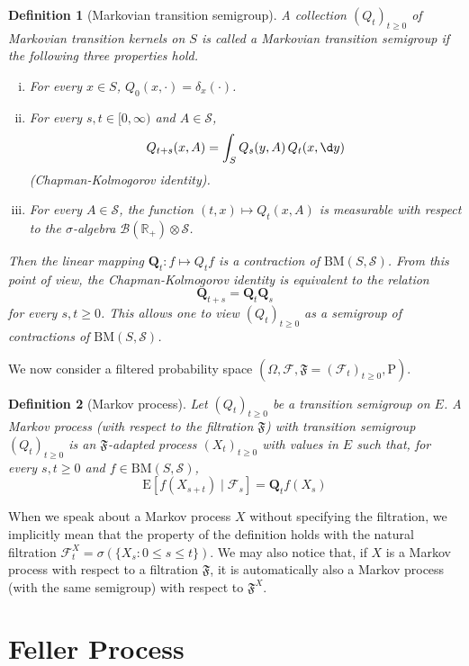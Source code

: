 \documentclass{report}
\newtheorem{definition}{Definition}[section]
\theoremstyle{nonumberplain}
\begin{document}
\begin{definition}[Markovian transition
	semigroup]
	A collection $\left(Q_t\right)_{t \geq 0}$ of Markovian transition kernels on $S$ is called a \emph{Markovian transition semigroup} if the following three properties hold.
	\begin{enumerate}[(i)]
	\item For every $x \in S$, $Q_0(x, \cdot)=\delta_x(\cdot)$.
	\item For every $s, t \in [0, \infty)$ and $A \in \mathcal{S}$,
	$$
	Q_{t+s}(x, A)=\int_S Q_s(y, A)\,Q_t(x,\d y) 
	$$
	(Chapman-Kolmogorov identity).
	\item For every $A \in \mathcal{S}$, the function $(t, x) \mapsto Q_t(x, A)$ is measurable with respect to the $\sigma$-algebra  $\mathcal{B}\left(\mathbb{R}_{+}\right) \otimes \mathcal{S}$.
\end{enumerate}
	Then the linear mapping $\mathbf{Q}_t: f \mapsto Q_t f$ is a contraction of $\mathrm{BM}(S,\mathcal{S})$. From this point of view, the Chapman-Kolmogorov identity is equivalent to the relation
	$$
	\mathbf{Q}_{t+s}=\mathbf{Q}_t\mathbf{Q}_s
	$$
	for every $s, t \geq 0$. This allows one to view $\left(Q_t\right)_{t \geq 0}$ as a semigroup of contractions of $\mathrm{BM}(S,\mathcal{S})$.
\end{definition}	
We now consider a filtered probability space $\left(\Omega, \mathcal{F},\mathfrak{F}=\left(\mathcal{F}_t\right)_{t \ge 0}, \mathrm{P}\right)$.
\begin{definition}[Markov process]
Let $\left(Q_t\right)_{t \geq 0}$ be a transition semigroup on $E$. A Markov process (with respect to the filtration $\mathfrak{F}$) with transition semigroup $\left(Q_t\right)_{t \geq 0}$ is an $\mathfrak{F}$-adapted process $\left(X_t\right)_{t \geq 0}$ with values in $E$ such that, for every $s, t \geq 0$ and $f \in \mathrm{BM}(S,\mathcal{S})$,
$$
\mathrm{E}\left[f\left(X_{s+t}\right) \mid \mathcal{F}_s\right]=\mathbf{Q}_t f\left(X_s\right)
$$
\end{definition}
When we speak about a Markov process $X$ without specifying the filtration, we implicitly mean that the property of
 the definition holds with the natural filtration $\mathcal{F}_t^X=\sigma \left(\{X_{s}:0\le s\le t\}\right)$. We may also notice that, if $X$ is a Markov process with respect to a filtration $\mathfrak{F}$, it is automatically also a Markov
 process (with the same semigroup) with respect to $\mathfrak{F}^X$.

\section{Feller Process}
\end{document}
